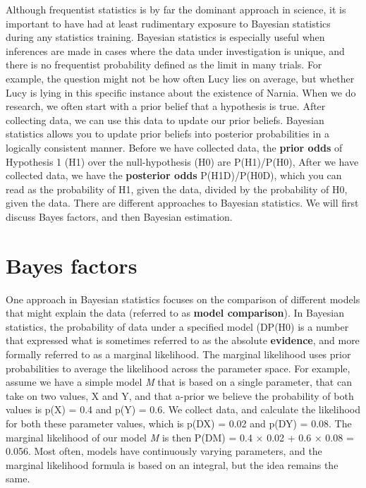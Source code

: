 \documentclass[
]{krantz}
\begin{document}
Although frequentist statistics is by far the dominant approach in science, it is important to have had at least rudimentary exposure to Bayesian statistics during any statistics training. Bayesian statistics is especially useful when inferences are made in cases where the data under investigation is unique, and there is no frequentist probability defined as the limit in many trials. For example, the question might not be how often Lucy lies on average, but whether Lucy is lying in this specific instance about the existence of Narnia. When we do research, we often start with a prior belief that a hypothesis is true. After collecting data, we can use this data to update our prior beliefs. Bayesian statistics allows you to update prior beliefs into posterior probabilities in a logically consistent manner. Before we have collected data, the \textbf{prior odds} of Hypothesis 1 (H1) over the null-hypothesis (H0) are P(H1)/P(H0), After we have collected data, we have the \textbf{posterior odds} P(H1\textbar D)/P(H0\textbar D), which you can read as the probability of H1, given the data, divided by the probability of H0, given the data. There are different approaches to Bayesian statistics. We will first discuss Bayes factors, and then Bayesian estimation.

\hypertarget{bayes-factors}{%
\section{Bayes factors}\label{bayes-factors}}

One approach in Bayesian statistics focuses on the comparison of different models that might explain the data (referred to as \textbf{model comparison}). In Bayesian statistics, the probability of data under a specified model (D\textbar P(H0) is a number that expressed what is sometimes referred to as the absolute \textbf{evidence}, and more formally referred to as a marginal likelihood. The marginal likelihood uses prior probabilities to average the likelihood across the parameter space. For example, assume we have a simple model \emph{M} that is
based on a single parameter, that can take on two values, X and Y, and that a-prior we believe the probability of both values is p(X) = 0.4 and p(Y) = 0.6. We collect data, and calculate the likelihood for both these parameter values, which is p(D\textbar X) = 0.02 and p(D\textbar Y) = 0.08. The marginal likelihood of our model \emph{M} is then P(D\textbar M) = 0.4 × 0.02 + 0.6 × 0.08 = 0.056. Most often, models have continuously varying parameters, and the marginal likelihood formula is based on an integral, but the idea remains the same.
\end{document}
